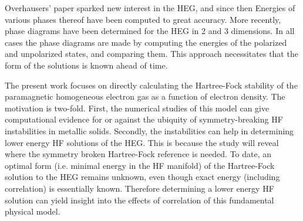 \documentclass[preprint, journal=prl]{revtex4-1}
\begin{document}
  Overhausers' paper sparked new interest in the HEG, and since then Energies of various phases thereof have been computed to great accuracy\cite{Ceperley1980}. More recently, phase diagrams have been determined for the HEG in 2 and 3 dimensions\cite{Delyon2008, Bernu2011, Baguet2013}. In all cases the phase diagrams are made by computing the energies of the polarized and unpolarized states, and comparing them. This approach necessitates that the form of the solutions is known ahead of time. 
  
  The present work focuses on directly calculating the Hartree-Fock stability of the paramagnetic homogeneous electron gas as a function of electron density. The motivation is two-fold. First, the numerical studies of this model can give computational evidence for or against the ubiquity of symmetry-breaking HF instabilities in metallic solids. Secondly, the instabilities can help in determining lower energy HF solutions of the HEG. This is because the study will reveal where the symmetry broken Hartree-Fock reference is needed. To date, an optimal form (i.e. minimal energy in the HF manifold) of the Hartree-Fock solution to the HEG remains unknown, even though exact energy (including correlation) is essentially known. Therefore determining a lower energy HF solution can yield insight into the effects of correlation of this fundamental physical model.
        
  
\end{document}
